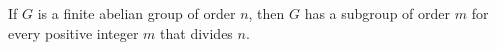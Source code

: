 If $G$ is a finite abelian group of order $n$, then $G$ has a subgroup of order $m$ for every positive integer $m$ that divides $n$.
